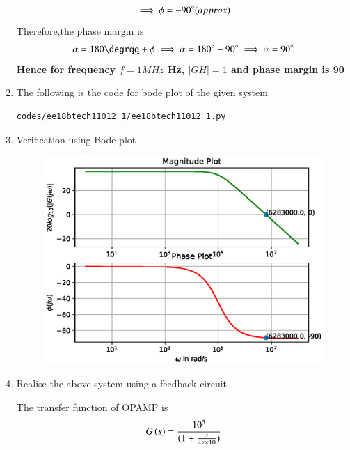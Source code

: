 \begin{enumerate}[label=\thesubsection.\arabic*.,ref=\thesubsection.\theenumi]
\begin{align}
\implies \phi = -90\degree (approx)
\end{align}
Therefore,the phase margin is
\begin{align}
    \alpha = 180\degrqq + \phi \implies \alpha = 180\degree - 90\degree\implies  \alpha = 90\degree
\end{align}
\textbf{Hence for frequency $f = 1 MHz$ Hz, $|GH| = 1$ and phase margin is 90\degree}
\item The following is the code for bode plot of the given system
\begin{lstlisting}
codes/ee18btech11012_1/ee18btech11012_1.py
\end{lstlisting}
\item Verification using Bode plot 
\begin{figure}[!h]
\centering
\includegraphics[width=\columnwidth]{./figs/ee18btech11012_1/ee18btech11012_1.eps}
\caption{}
\label{fig:ee18btech11012_1}
\end{figure}
\item Realise the above system using a feedback circuit.\\
\solution
\begin{figure}[ht!]
	\begin{center}
		\resizebox{\columnwidth/1}{!}{}
	\end{center}
	\caption{}
	\label{fig:ee18btech11012_fig1}
\end{figure}
The transfer function of OPAMP is
\begin{align}
    G\left(s\right) = \frac{10^{5}}{(1+\frac{s}{2\pi\times10})}
\end{align}

\end{enumerate}
